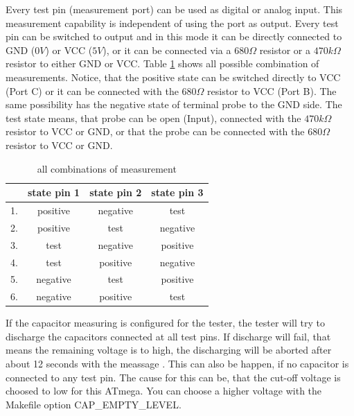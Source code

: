 Every test pin (measurement port) can be used as digital or analog input. This measurement capability is
independent of using the port as output.
Every test pin can be switched to output and in this mode it can be directly connected to GND (\(0V\)) or VCC (\(5V\)), 
or it can be connected via a \(680\Omega\) resistor or a \(470k\Omega\) resistor to either GND or VCC.
Table \ref{tab:case} shows all possible combination of measurements.
Notice, that the positive state can be switched directly to VCC (Port C) or it can be connected with the 
\(680\Omega\) resistor to VCC (Port B). The same possibility has the negative state of terminal probe to the GND side.
The test state means, that probe can be open (Input), connected with the \(470k\Omega\) resistor to VCC or GND,
or that the probe can be connected with the \(680\Omega\) resistor to VCC or GND.

\begin{table}[H]
  \begin{center}
    \begin{tabular}{| l | c | c | c |}
    \hline
      & state pin 1 & state pin 2 & state pin 3 \\
    \hline
   1. & positive    &  negative    &  test \\
   2. & positive    &  test       & negative \\
   3. & test        &  negative    & positive \\
   4. & test        &  positive    & negative \\
   5. & negative     &  test       & positive \\
   6. & negative     &  positive    &  test  \\
    \hline
    \end{tabular}
  \end{center}
  \caption{all combinations of measurement}
  \label{tab:case} 
\end{table}

If the capacitor measuring is configured for the tester, the tester will try to discharge the capacitors connected at all
test pins.
If discharge will fail, that means the remaining voltage is to high, the discharging will be aborted after about 12 seconds
with the meassage . This can also be happen, if no capacitor is connected to any test pin.
The cause for this can be, that the cut-off voltage is choosed to low for this ATmega.
You can choose a higher voltage with the Makefile option CAP\_EMPTY\_LEVEL.
